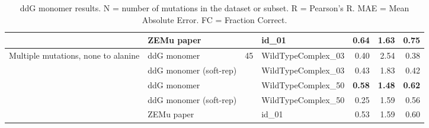 \begin{table}
\begin{tabular}{llrlrrr}
 & ZEMu paper & & id\_01 & \textbf{0.64} & 1.63 & 0.75  \\
\hline
 \multirow{ 5}{*}{Multiple mutations, none to alanine} & ddG monomer & \multirow{ 5}{*}{45} & WildTypeComplex\_03 & 0.40 & 2.54 & 0.38  \\
 & ddG monomer (soft-rep) & & WildTypeComplex\_03 & 0.43 & 1.83 & 0.42  \\
 & ddG monomer & & WildTypeComplex\_50 & \textbf{0.58} & \textbf{1.48} & \textbf{0.62}  \\
 & ddG monomer (soft-rep) & & WildTypeComplex\_50 & 0.25 & 1.59 & 0.56  \\
 & ZEMu paper & & id\_01 & 0.53 & 1.59 & 0.60  \\
\bottomrule
\end{tabular}
  \caption[ddG monomer results]{
    ddG monomer results. N = number of mutations in the dataset or subset. R = Pearson's R. MAE = Mean Absolute Error. FC = Fraction Correct.
  } \label{tab:table-ddG-monomer}
\end{table}
